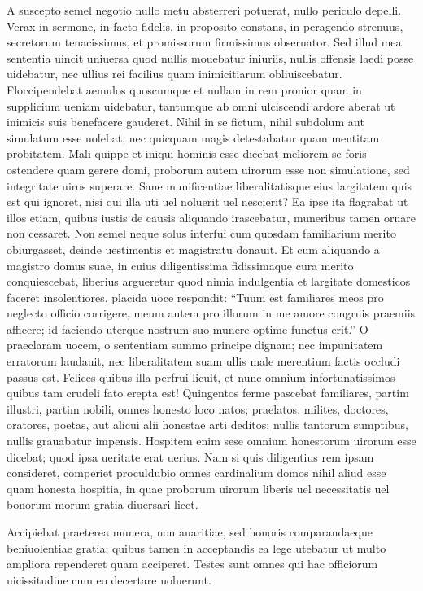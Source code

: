 \documentclass[a5paper,twoside]{article}
\begin{document}
A suscepto semel negotio nullo metu absterreri potuerat, nullo periculo depelli. Verax in sermone, in facto fidelis, in proposito constans, in peragendo strenuus, secretorum tenacissimus, et promissorum firmissimus obseruator. Sed illud mea sententia uincit uniuersa quod nullis mouebatur iniuriis, nullis offensis laedi posse uidebatur, nec ullius rei facilius quam inimicitiarum obliuiscebatur. Floccipendebat aemulos quoscumque et nullam in rem pronior quam in supplicium ueniam uidebatur, tantumque ab omni ulciscendi ardore aberat ut inimicis suis benefacere gauderet. Nihil in se fictum, nihil subdolum aut simulatum esse uolebat, nec quicquam magis detestabatur quam mentitam probitatem. Mali quippe et iniqui hominis esse dicebat meliorem se foris ostendere quam gerere domi, proborum autem uirorum esse non simulatione, sed integritate uiros superare. Sane munificentiae liberalitatisque eius largitatem quis est qui ignoret, nisi qui illa uti uel noluerit uel nescierit? Ea ipse ita flagrabat ut illos etiam, quibus iustis de causis aliquando irascebatur, muneribus tamen ornare non cessaret. Non semel neque solus interfui cum quosdam familiarium merito obiurgasset, deinde uestimentis et magistratu donauit. Et cum aliquando a magistro domus suae, in cuius diligentissima fidissimaque cura merito conquiescebat, liberius argueretur quod nimia indulgentia et largitate domesticos faceret insolentiores, placida uoce respondit: ``Tuum est familiares meos pro neglecto officio corrigere, meum autem pro illorum in me amore congruis praemiis afficere; id faciendo uterque nostrum suo munere optime functus erit.'' O praeclaram uocem, o sententiam summo principe dignam; nec impunitatem erratorum laudauit, nec liberalitatem suam ullis male merentium factis occludi passus est. Felices quibus illa perfrui licuit, et nunc omnium infortunatissimos quibus tam crudeli fato erepta est! Quingentos ferme pascebat familiares, partim illustri, partim nobili, omnes honesto loco natos; praelatos, milites, doctores, oratores, poetas, aut alicui alii honestae arti deditos; nullis tantorum sumptibus, nullis grauabatur impensis. Hospitem enim sese omnium honestorum uirorum esse dicebat; quod ipsa ueritate erat uerius. Nam si quis diligentius rem ipsam consideret, comperiet proculdubio omnes cardinalium domos nihil aliud esse quam honesta hospitia, in quae proborum uirorum liberis uel necessitatis uel bonorum morum gratia diuersari licet.

Accipiebat praeterea munera, non auaritiae, sed honoris comparandaeque beniuolentiae gratia; quibus tamen in acceptandis ea lege utebatur ut multo ampliora rependeret quam acciperet. Testes sunt omnes qui hac officiorum uicissitudine cum eo decertare uoluerunt.


\endnumbering
\end{document}
